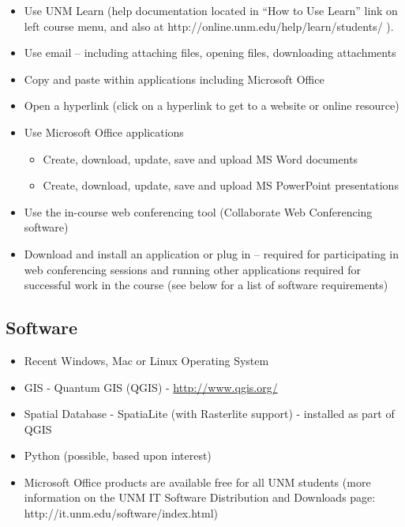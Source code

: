 \documentclass[
]{article}
\providecommand{\tightlist}{%
  \setlength{\itemsep}{0pt}\setlength{\parskip}{0pt}}
\begin{document}
\begin{itemize}
\tightlist
\item
  Use UNM Learn (help documentation located in ``How to Use Learn'' link
  on left course menu, and also at
  http://online.unm.edu/help/learn/students/ ).
\item
  Use email -- including attaching files, opening files, downloading
  attachments
\item
  Copy and paste within applications including Microsoft Office
\item
  Open a hyperlink (click on a hyperlink to get to a website or online
  resource)
\item
  Use Microsoft Office applications

  \begin{itemize}
  \tightlist
  \item
    Create, download, update, save and upload MS Word documents
  \item
    Create, download, update, save and upload MS PowerPoint
    presentations
  \end{itemize}
\item
  Use the in-course web conferencing tool (Collaborate Web Conferencing
  software)
\item
  Download and install an application or plug in -- required for
  participating in web conferencing sessions and running other
  applications required for successful work in the course (see below for
  a list of software requirements)
\end{itemize}

\hypertarget{software}{%
\subsection{Software}\label{software}}

\begin{itemize}
\tightlist
\item
  Recent Windows, Mac or Linux Operating System
\item
  GIS - Quantum GIS (QGIS) - \url{http://www.qgis.org/}
\item
  Spatial Database - SpatiaLite (with Rasterlite support) - installed as
  part of QGIS
\item
  Python (possible, based upon interest)
\item
  Microsoft Office products are available free for all UNM students
  (more information on the UNM IT Software Distribution and Downloads
  page: http://it.unm.edu/software/index.html)
\end{itemize}
\end{document}
